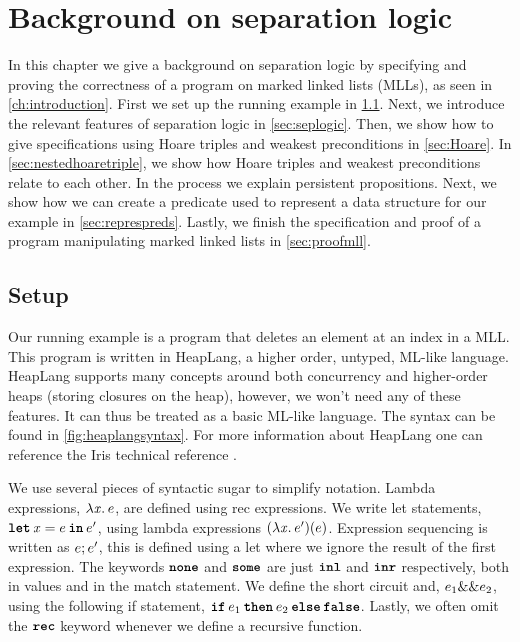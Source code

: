\documentclass[thesis.tex]{subfiles}
\begin{document}
\chapter{Background on separation logic}
\label{ch:backgroundseplogic}

In this chapter we give a background on separation logic by specifying and proving the correctness of a program on marked linked lists (MLLs), as seen in \cref*{ch:introduction}. First we set up the running example in \cref*{sec:irissetup}. Next, we introduce the relevant features of separation logic in \cref*{sec:seplogic}. Then, we show how to give specifications using Hoare triples and weakest preconditions in \cref*{sec:Hoare}. In \cref*{sec:nestedhoaretriple}, we show how Hoare triples and weakest preconditions relate to each other. In the process we explain persistent propositions. Next, we show how we can create a predicate used to represent a data structure for our example in \cref*{sec:represpreds}. Lastly, we finish the specification and proof of a program manipulating marked linked lists in \cref*{sec:proofmll}.

\section{Setup}
\label{sec:irissetup}
Our running example is a program that deletes an element at an index in a MLL. This program is written in HeapLang, a higher order, untyped, ML-like language. HeapLang supports many concepts around both concurrency and higher-order heaps (storing closures on the heap), however, we won't need any of these features. It can thus be treated as a basic ML-like language. The syntax can be found in \cref*{fig:heaplangsyntax}. For more information about HeapLang one can reference the Iris technical reference \cite*{iristeamIrisReference2023}.

We use several pieces of syntactic sugar to simplify notation. Lambda expressions, $\Lam \lvar. \expr$, are defined using rec expressions. We write let statements, $\Let \lvar = \expr in \expr'$, using lambda expressions $(\Lam \lvar. \expr')(\expr)$. Expression sequencing is written as $e; e'$, this is defined using a let where we ignore the result of the first expression. The keywords $\operatorname{\texttt{\bfseries none}}$ and $\operatorname{\texttt{\bfseries some}}$ are just $\operatorname{\texttt{\bfseries inl}}$ and $\operatorname{\texttt{\bfseries inr}}$ respectively, both in values and in the match statement. We define the short circuit and, $e_1 \&\& e_2$, using the following if statement, $\If \expr_1 then \expr_2 \Else \False$. Lastly, we often omit the $\texttt{\bfseries rec}$ keyword whenever we define a recursive function.
\end{document}
